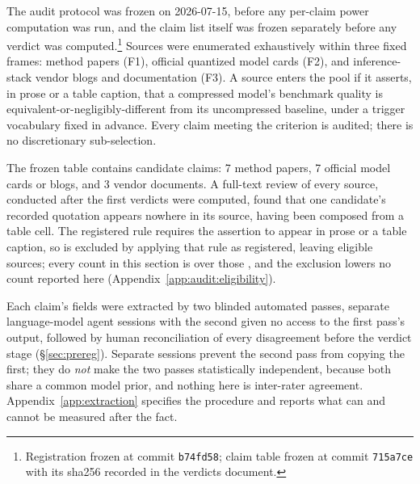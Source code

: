 The audit protocol was frozen on 2026-07-15, before any per-claim power
computation was run, and the claim list itself was frozen separately before any
verdict was computed.\footnote{%
Registration frozen at commit \texttt{b74fd58}; claim table frozen at commit
\texttt{715a7ce} with its sha256 recorded in the verdicts document.}
Sources were enumerated exhaustively within three fixed frames: method papers
(F1), official quantized model cards (F2), and inference-stack vendor blogs and
documentation (F3). A source enters the pool if it asserts, in prose or a table
caption, that a compressed model's benchmark quality is
equivalent-or-negligibly-different from its uncompressed baseline, under a
trigger vocabulary fixed in advance. Every claim meeting the criterion is
audited; there is no discretionary sub-selection.

The frozen table contains \AuditFrozenCandidates{} candidate claims: 7 method
papers, 7 official model cards or blogs, and 3 vendor documents. A full-text
review of every source, conducted after the first verdicts were computed, found
that one candidate's recorded quotation appears nowhere in its source, having
been composed from a table cell. The registered rule requires the assertion to
appear in prose or a table caption, so \AuditIneligibleClaim{} is excluded by
applying that rule as registered, leaving \textbf{\AuditEligible{}} eligible
sources; every count in this section is over those \AuditEligible{}, and the
exclusion lowers no count reported here
(Appendix~\ref{app:audit:eligibility}).

Each claim's fields were extracted by two blinded automated passes, separate
language-model agent sessions with the second given no access to the first
pass's output, followed by human reconciliation of every disagreement before the
verdict stage (\S\ref{sec:prereg}). Separate sessions prevent the second pass
from copying the first; they do \emph{not} make the two passes statistically
independent, because both share a common model prior, and nothing here is
inter-rater agreement. Appendix~\ref{app:extraction} specifies the procedure and
reports what can and cannot be measured after the fact.

